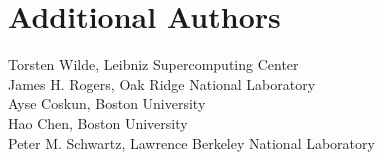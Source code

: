 \section {Additional Authors}
Torsten Wilde, Leibniz Supercomputing Center\\
James H. Rogers, Oak Ridge National Laboratory\\
Ayse Coskun, Boston University\\
Hao Chen, Boston University\\
Peter M. Schwartz, Lawrence Berkeley National Laboratory
